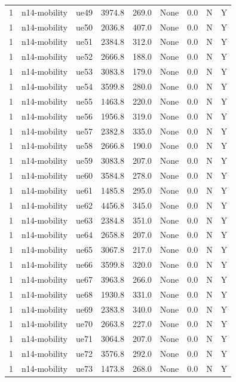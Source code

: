 \begin{table}[ht]
\begin{tabular}{|c|c|c|c|c|c|c|c|c|}
1 & n14-mobility & ue49 & 3974.8 & 269.0 & None & 0.0 & N & Y \\
1 & n14-mobility & ue50 & 2036.8 & 407.0 & None & 0.0 & N & Y \\
1 & n14-mobility & ue51 & 2384.8 & 312.0 & None & 0.0 & N & Y \\
1 & n14-mobility & ue52 & 2666.8 & 188.0 & None & 0.0 & N & Y \\
1 & n14-mobility & ue53 & 3083.8 & 179.0 & None & 0.0 & N & Y \\
1 & n14-mobility & ue54 & 3599.8 & 280.0 & None & 0.0 & N & Y \\
1 & n14-mobility & ue55 & 1463.8 & 220.0 & None & 0.0 & N & Y \\
1 & n14-mobility & ue56 & 1956.8 & 319.0 & None & 0.0 & N & Y \\
1 & n14-mobility & ue57 & 2382.8 & 335.0 & None & 0.0 & N & Y \\
1 & n14-mobility & ue58 & 2666.8 & 190.0 & None & 0.0 & N & Y \\
1 & n14-mobility & ue59 & 3083.8 & 207.0 & None & 0.0 & N & Y \\
1 & n14-mobility & ue60 & 3584.8 & 278.0 & None & 0.0 & N & Y \\
1 & n14-mobility & ue61 & 1485.8 & 295.0 & None & 0.0 & N & Y \\
1 & n14-mobility & ue62 & 4456.8 & 345.0 & None & 0.0 & N & Y \\
1 & n14-mobility & ue63 & 2384.8 & 351.0 & None & 0.0 & N & Y \\
1 & n14-mobility & ue64 & 2658.8 & 207.0 & None & 0.0 & N & Y \\
1 & n14-mobility & ue65 & 3067.8 & 217.0 & None & 0.0 & N & Y \\
1 & n14-mobility & ue66 & 3599.8 & 320.0 & None & 0.0 & N & Y \\
1 & n14-mobility & ue67 & 3963.8 & 266.0 & None & 0.0 & N & Y \\
1 & n14-mobility & ue68 & 1930.8 & 331.0 & None & 0.0 & N & Y \\
1 & n14-mobility & ue69 & 2383.8 & 340.0 & None & 0.0 & N & Y \\
1 & n14-mobility & ue70 & 2663.8 & 227.0 & None & 0.0 & N & Y \\
1 & n14-mobility & ue71 & 3064.8 & 207.0 & None & 0.0 & N & Y \\
1 & n14-mobility & ue72 & 3576.8 & 292.0 & None & 0.0 & N & Y \\
1 & n14-mobility & ue73 & 1473.8 & 268.0 & None & 0.0 & N & Y \\

\end{tabular}
\end{table}
